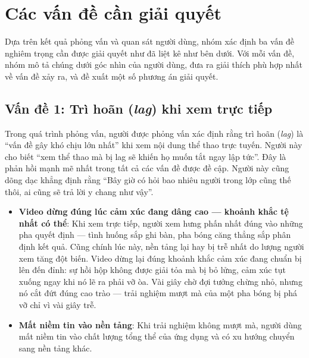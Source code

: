 \section{Các vấn đề cần giải quyết}

Dựa trên kết quả phỏng vấn và quan sát người dùng, nhóm xác định ba vấn đề nghiêm trọng cần được giải quyết như đã liệt kê như bên dưới. Với mỗi vấn đề, nhóm mô tả chúng dưới góc nhìn của người dùng, đưa ra giải thích phù hợp nhất về vấn đề xảy ra, và đề xuất một số phương án giải quyết.

\subsection{Vấn đề 1: Trì hoãn (\textit{lag}) khi xem trực tiếp}

Trong quá trình phỏng vấn, người được phỏng vấn xác định rằng trì hoãn (\textit{lag}) là ``vấn đề gây khó chịu lớn nhất'' khi xem nội dung thể thao trực tuyến. Người này cho biết ``xem thể thao mà bị lag sẽ khiến họ muốn tắt ngay lập tức''. Đây là phản hồi mạnh mẽ nhất trong tất cả các vấn đề được đề cập. Người này cũng dõng dạc khẳng định rằng ``Bây giờ có hỏi bao nhiêu người trong lớp cũng thế thôi, ai cũng sẽ trả lời y chang như vậy''.

\begin{itemize}[leftmargin=*, nosep]
    \item \textbf{Video dừng đúng lúc cảm xúc đang dâng cao — khoảnh khắc tệ nhất có thể}: Khi xem trực tiếp, người xem hưng phấn nhất đúng vào những pha quyết định — tình huống sắp ghi bàn, pha bóng căng thẳng sắp phân định kết quả. Cũng chính lúc này, nền tảng lại hay bị trễ nhất do lượng người xem tăng đột biến. Video dừng lại đúng khoảnh khắc cảm xúc đang chuẩn bị lên đến đỉnh: sự hồi hộp không được giải tỏa mà bị bỏ lửng, cảm xúc tụt xuống ngay khi nó lẽ ra phải vỡ òa. Vài giây chờ đợi tưởng chừng nhỏ, nhưng nó cắt đứt đúng cao trào — trải nghiệm mượt mà của một pha bóng bị phá vỡ chỉ vì vài giây trễ.
    \item \textbf{Mất niềm tin vào nền tảng}: Khi trải nghiệm không mượt mà, người dùng mất niềm tin vào chất lượng tổng thể của ứng dụng và có xu hướng chuyển sang nền tảng khác.
\end{itemize}

